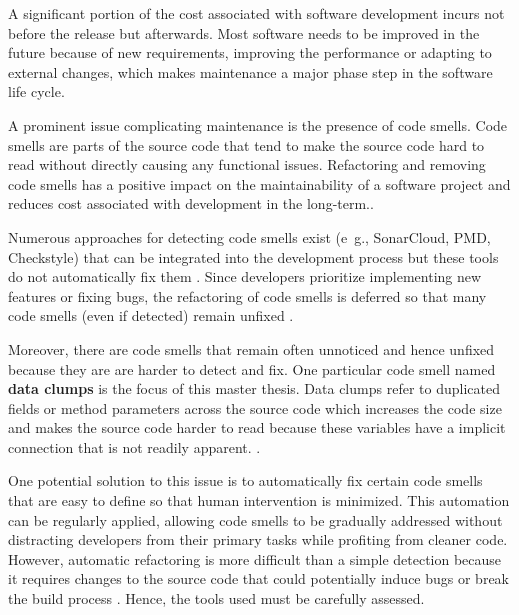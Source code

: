 \label{sec:introduction}

A significant portion of the cost associated with software development incurs not before the release but afterwards. Most software needs to be improved in the future because of new requirements, improving the performance or adapting to external changes, which makes maintenance a major phase step in the  software life cycle.


A prominent issue  complicating maintenance is the presence of code smells. Code smells are parts of the source code that tend to make the source code hard to read without directly causing any functional issues. Refactoring and removing code smells has a positive impact on the maintainability  of a software project and reduces cost associated with development in the long-term.\cite{mealyEvaluatingSoftwareRefactoring2006}.



Numerous approaches for detecting code smells exist (e~g., SonarCloud,  PMD, Checkstyle) that can be integrated into the development process but these tools do not automatically fix them  \cite{vidalApproachPrioritizeCode2016}. Since developers prioritize implementing new features or fixing bugs, the refactoring of code smells is deferred so that many code smells (even if detected) remain unfixed   \cite{10.1145/2393596.2393655}.

Moreover, there are code smells that remain often unnoticed and hence unfixed because they are are harder to detect and fix. One particular code smell named \textbf{data clumps} is the focus of this master thesis. Data clumps refer to duplicated fields or method parameters across the source code which increases the code size and makes the source code harder to read because these variables have a implicit connection that is not readily apparent.  \cite{BaumgartnerAP23}  \cite{data_clumps_refactoring_guru} \cite{join_data_items}.
 



One potential solution to this issue is to automatically fix certain code smells that are easy to define so that human intervention is minimized. This automation can be regularly applied, allowing code smells to be gradually addressed without distracting developers from their primary tasks while profiting from cleaner code. 
However,  automatic refactoring  is more difficult than a simple detection because it requires changes to the source code that could potentially induce bugs or break the build process \cite{9796303}. Hence, the tools used must be carefully assessed. 

